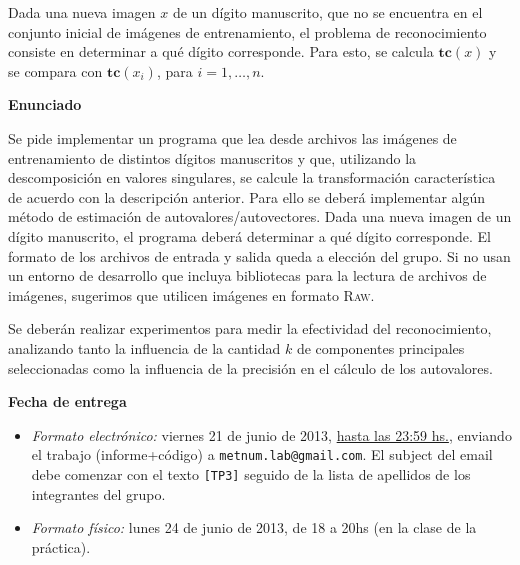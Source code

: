 Dada una nueva imagen $x$ de un d\'igito manuscrito, que no se encuentra en el conjunto inicial de im\'agenes de entrenamiento, el problema de reconocimiento consiste en determinar a qu\'e d\'igito corresponde. Para esto, se calcula $\mathbf{tc}(x)$ y se compara con $\mathbf{tc}(x_i)$, para $i = 1,\ldots, n$.


{\bf Enunciado}

Se pide implementar un programa que lea desde archivos las im\'agenes de entrenamiento de distintos d\'igitos manuscritos y que, utilizando la descomposici\'on en valores singulares, se calcule la transformaci\'on caracter\'istica de acuerdo con la descripci\'on anterior. Para ello se deber\'a implementar alg\'un m\'etodo de estimaci\'on de autovalores/autovectores. Dada una nueva imagen de un d\'igito manuscrito, el programa deber\'a determinar a qu\'e d\'igito co\-rres\-pon\-de.
El formato de los archivos de entrada y salida queda a elecci\'on del grupo. Si no usan un entorno de desarrollo que incluya bibliotecas para la lectura de archivos de im\'agenes, sugerimos que utilicen im\'agenes en formato \textsc{Raw}. 

Se deber\'an realizar experimentos para medir la efectividad del reconocimiento, analizando tanto la influencia de la cantidad $k$ de componentes principales seleccionadas como la influencia de la precisi\'on en el c\'alculo de los autovalores.


{\bf Fecha de entrega} 

\begin{itemize}
\item \textsl{Formato electr\'onico:} viernes 21 de junio de 2013, \underline{hasta las 23:59 hs.}, enviando el trabajo (informe+c\'odigo) a \texttt{metnum.lab@gmail.com}. El subject del email debe comenzar con el texto \verb|[TP3]| seguido de la lista de apellidos de los integrantes del grupo. 
\item \textsl{Formato f\'isico:} lunes 24 de junio de 2013, de 18 a 20hs (en la clase de la pr\'actica).
\end{itemize}